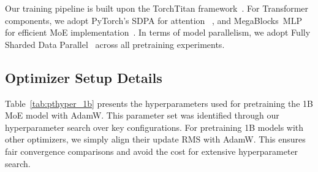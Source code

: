 \documentclass{llmxive}
\begin{document}
Our training pipeline is built upon the TorchTitan framework~\citep{torchtitan}.
For Transformer components, we adopt PyTorch’s SDPA for attention ~\citep{pytorch},
and MegaBlocks~\(\mathrm{MLP}\) for efficient MoE implementation~\citep{megablocks}.
In terms of model parallelism, we adopt Fully Sharded Data Parallel~\citep{fsdp} across all pretraining experiments.

\begin{table}[!htbp]
  \centering
  \small
  \caption{Hyperparameters of model architectures.}
  \label{tab:mdhyper}
\end{table}

\subsection{Optimizer Setup Details}
Table~\ref{tab:pthyper_1b} presents the hyperparameters used for pretraining the 1B MoE model with AdamW.
This parameter set was identified through our hyperparameter search over key configurations.
For pretraining 1B models with other optimizers, we simply align their update RMS with AdamW. 
This ensures fair convergence comparisons and avoid the cost for extensive hyperparameter search.
\end{document}
